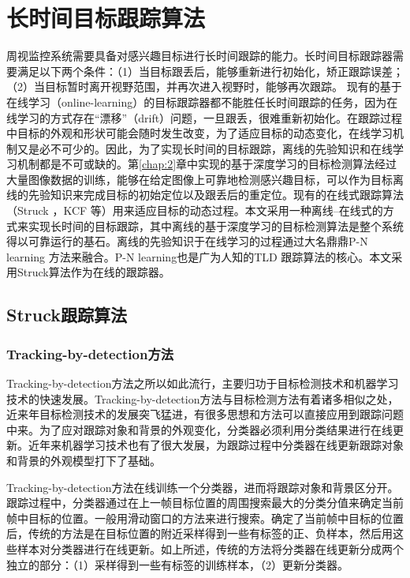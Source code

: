 \chapter{长时间目标跟踪算法}
周视监控系统需要具备对感兴趣目标进行长时间跟踪的能力。长时间目标跟踪器需要满足以下两个条件：（1）当目标跟丢后，能够重新进行初始化，矫正跟踪误差；（2）当目标暂时离开视野范围，并再次进入视野时，能够再次跟踪。
现有的基于在线学习（online-learning）的目标跟踪器都不能胜任长时间跟踪的任务，因为在线学习的方式存在``漂移''（drift）问题，一旦跟丢，很难重新初始化。在跟踪过程中目标的外观和形状可能会随时发生改变，为了适应目标的动态变化，在线学习机制又是必不可少的。因此，为了实现长时间的目标跟踪，离线的先验知识和在线学习机制都是不可或缺的。第\ref{chap:2}章中实现的基于深度学习的目标检测算法经过大量图像数据的训练，能够在给定图像上可靠地检测感兴趣目标，可以作为目标离线的先验知识来完成目标的初始定位以及跟丢后的重定位。现有的在线式跟踪算法（Struck \cite{struck}，KCF \cite{kcf} 等）用来适应目标的动态过程。本文采用一种离线--在线式的方式来实现长时间的目标跟踪，其中离线的基于深度学习的目标检测算法是整个系统得以可靠运行的基石。离线的先验知识于在线学习的过程通过大名鼎鼎P-N learning \cite{p-n} 方法来融合。P-N learning也是广为人知的TLD \cite{tld} 跟踪算法的核心。本文采用Struck算法作为在线的跟踪器。
\section{Struck跟踪算法}

\subsection{Tracking-by-detection方法}
Tracking-by-detection方法之所以如此流行，主要归功于目标检测技术和机器学习技术的快速发展。Tracking-by-detection方法与目标检测方法有着诸多相似之处，近来年目标检测技术的发展突飞猛进，有很多思想和方法可以直接应用到跟踪问题中来。为了应对跟踪对象和背景的外观变化，分类器必须利用分类结果进行在线更新。近年来机器学习技术也有了很大发展，为跟踪过程中分类器在线更新跟踪对象和背景的外观模型打下了基础。

Tracking-by-detection方法在线训练一个分类器，进而将跟踪对象和背景区分开。跟踪过程中，分类器通过在上一帧目标位置的周围搜索最大的分类分值来确定当前帧中目标的位置。一般用滑动窗口的方法来进行搜索。确定了当前帧中目标的位置后，传统的方法是在目标位置的附近采样得到一些有标签的正、负样本，然后用这些样本对分类器进行在线更新。如上所述，传统的方法将分类器在线更新分成两个独立的部分：（1）采样得到一些有标签的训练样本，（2）更新分类器。

